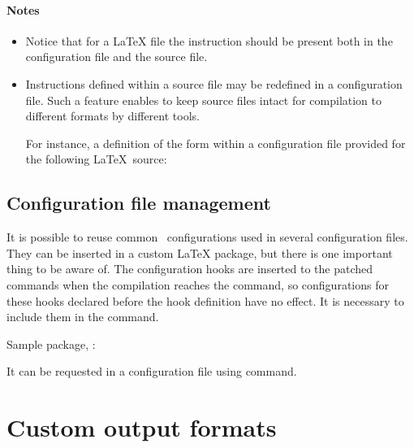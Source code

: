 \paragraph{Notes}

\begin{itemize}
  \item Notice that for a LaTeX file the \texcommand{}
    instruction should be present both in the configuration file and the source
    file.

  \item Instructions defined within a source file may be redefined in a
    configuration file. Such a feature enables to keep source files intact for
    compilation to different formats by different tools.

    For instance, a definition of the form  within a
    configuration file provided for the following \LaTeX\ source:
\end{itemize}



\subsection{Configuration file management}

It is possible to reuse common \texfourht\ configurations used in several
configuration files.  They can be inserted in a custom LaTeX package, but there
is one important thing to be aware of. The configuration hooks are inserted to
the patched commands when the compilation reaches the  
\texcommand{} command, so configurations for these hooks
declared before the hook definition have no effect. It is necessary to include
them in the  command.

Sample package, :


It can be requested in a configuration file using  command.

\begin{texsource}
\RequirePackage{commonconfigurations}

\EndPreamble
\end{texsource}

\section{Custom output formats}

